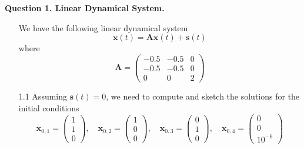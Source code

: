 \documentclass[12pt]{article}
\begin{document}
\noindent


\noindent\textbf{Question 1. Linear Dynamical System.}
\begin{enumerate}
\item[]We have the following linear dynamical system 
\[
    \dot{\mathbf{x}}(t) = \mathbf{Ax}(t) + \mathbf{s}(t)
\]
where
$$\mathbf{A} = \begin{pmatrix}
    -0.5 & -0.5 & 0\\
    -0.5 & -0.5 & 0\\
        0 &    0 & 2
\end{pmatrix}$$
\item[1.1] Assuming $\mathbf{s}(t)=0$, we need to compute and sketch the solutions for the initial conditions
\[
    \mathbf{x}_{0,1} = \begin{pmatrix} 1\\ 1\\ 0 \end{pmatrix}, \quad 
    \mathbf{x}_{0,2} = \begin{pmatrix} 1\\ 0\\ 0 \end{pmatrix}, \quad
    \mathbf{x}_{0,3} = \begin{pmatrix} 0\\ 1\\ 0 \end{pmatrix}, \quad
    \mathbf{x}_{0,4} = \begin{pmatrix} 0\\ 0\\ 10^{-6} \end{pmatrix}
\]


\end{enumerate}
\end{document}
